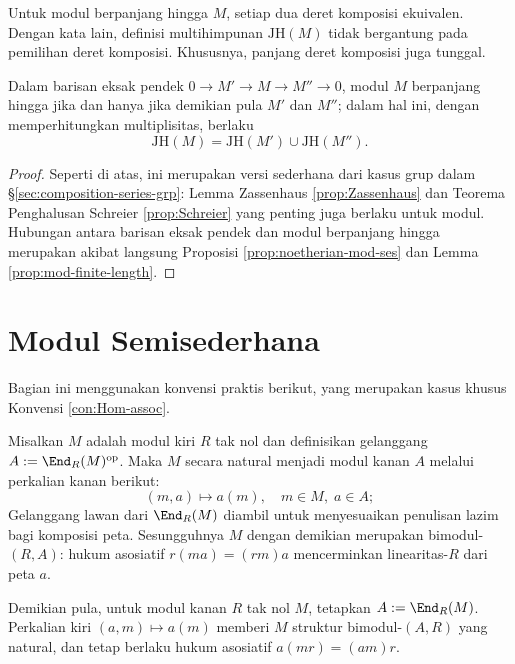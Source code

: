 \begin{theorem}\label{prop:JH-mod}
	Untuk modul berpanjang hingga $M$, setiap dua deret komposisi ekuivalen. Dengan kata lain, definisi multihimpunan $\text{JH}(M)$ tidak bergantung pada pemilihan deret komposisi. Khususnya, panjang deret komposisi juga tunggal.
	
	Dalam barisan eksak pendek $0 \to M' \to M \to M'' \to 0$, modul $M$ berpanjang hingga jika dan hanya jika demikian pula $M'$ dan $M''$; dalam hal ini, dengan memperhitungkan multiplisitas, berlaku
	\[ \text{JH}(M) = \text{JH}(M') \cup \text{JH}(M''). \]
\end{theorem}
\begin{proof}
	Seperti di atas, ini merupakan versi sederhana dari kasus grup dalam \S\ref{sec:composition-series-grp}: Lemma Zassenhaus \ref{prop:Zassenhaus} dan Teorema Penghalusan Schreier \ref{prop:Schreier} yang penting juga berlaku untuk modul. Hubungan antara barisan eksak pendek dan modul berpanjang hingga merupakan akibat langsung Proposisi \ref{prop:noetherian-mod-ses} dan Lemma \ref{prop:mod-finite-length}.
\end{proof}
 
\section{Modul Semisederhana}
Bagian ini menggunakan konvensi praktis berikut, yang merupakan kasus khusus Konvensi \ref{con:Hom-assoc}.
\begin{convention}\label{con:left-right-End}
	Misalkan $M$ adalah modul kiri $R$ tak nol dan definisikan gelanggang $A := \End_R(M)^\text{op}$. Maka $M$ secara natural menjadi modul kanan $A$ melalui perkalian kanan berikut:
	\[ (m, a) \mapsto a(m), \quad m \in M, \; a \in A;  \]
Gelanggang lawan dari $\End_R(M)$ diambil untuk menyesuaikan penulisan lazim bagi komposisi peta. Sesungguhnya $M$ dengan demikian merupakan bimodul-$(R,A)$: hukum asosiatif $r(ma) = (rm)a$ mencerminkan linearitas-$R$ dari peta $a$.

	Demikian pula, untuk modul kanan $R$ tak nol $M$, tetapkan $A := \End_R(M)$. Perkalian kiri $(a, m) \mapsto a(m)$ memberi $M$ struktur bimodul-$(A,R)$ yang natural, dan tetap berlaku hukum asosiatif $a(mr) = (am)r$.
\end{convention}

